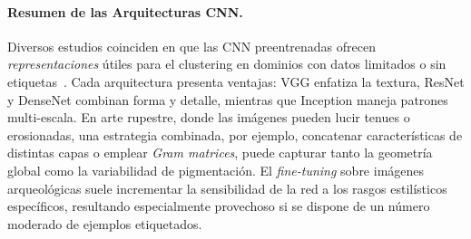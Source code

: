 \paragraph{Resumen de las Arquitecturas CNN.}
Diversos estudios coinciden en que las CNN preentrenadas ofrecen \textit{representaciones} útiles para el clustering en dominios con datos limitados o sin etiquetas~\cite{guerin2018,gairola2020}.
Cada arquitectura presenta ventajas: VGG enfatiza la textura, ResNet y DenseNet combinan forma y detalle, mientras que Inception maneja patrones multi-escala.
En arte rupestre, donde las imágenes pueden lucir tenues o erosionadas, una estrategia combinada, por ejemplo, concatenar características de distintas capas o emplear \textit{Gram matrices}, puede capturar tanto la geometría global como la variabilidad de pigmentación.
El \textit{fine-tuning} sobre imágenes arqueológicas suele incrementar la sensibilidad de la red a los rasgos estilísticos específicos, resultando especialmente provechoso si se dispone de un número moderado de ejemplos etiquetados.

